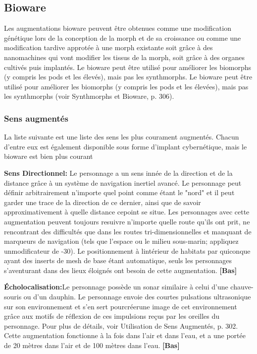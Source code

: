 \subsection{Bioware} \label{sec:bioware} 

Les augmentations bioware peuvent être obtenues comme une modification génétique lors de la conception de la morph et de sa croissance ou comme une modification tardive approtée à une morph existante soit grâce à des nanomachines qui vont modifier les tissus de la morph, soit grâce à des organes cultivés puis implantés. Le bioware peut être utilisé pour améliorer les biomorphs (y compris les pods et les élevés), mais pas les synthmorphs. Le bioware peut être utilisé pour améliorer les biomorphs (y compris les pods et les élevées), mais pas les synthmorphs (voir Synthmorphs et Bioware, p. 306). 

\subsubsection{Sens augmentés} 

La liste suivante est une liste des sens les plus courament augmentés. Chacun d'entre eux est également disponible sous forme d'implant cybernétique, mais le bioware est bien plus courant 

\textbf{Sens Directionnel:} Le personnage a un sens innée de la direction et de la distance grâce à un système de navigation inertiel avancé. Le personnage peut définir arbitrairement n'importe quel point comme étant le "nord" et il peut garder une trace de la direction de ce dernier, ainsi que de savoir approximativement à quelle distance cepoint se situe. Les personnages avec cette augmentation peuvent toujours resuivre n'importe quelle route qu'ils ont prit, ne rencontrant des difficultés que dans les routes tri-dimensionnelles et manquant de marqueurs de navigation (tels que l'espace ou le milieu sous-marin; appliquez unmodificateur de -30). Le positionnement à lintérieur de habitats par quiconque ayant des inserts de mesh de base étant automatique, seuls les personnages s'aventurant dans des lieux éloignés ont besoin de cette augmentation. \textbf{[Bas]} 

\textbf{Écholocalisation:}Le personnage possède un sonar similaire à celui d'une chauve-souris ou d'un dauphin. Le personnage envoie des courtes pulsations ultrasonique sur son environnement et s'en sert pourcréerune image de cet environnement grâce aux motifs de réflexion de ces impulsions reçus par les oreilles du personnage. Pour plus de détails, voir Utilisation de Sens Augmentés, p. 302. Cette augmentation fonctionne à la fois dans l'air et dans l'eau, et a une portée de 20 mètres dans l'air et de 100 mètres dans l'eau. \textbf{[Bas]} 

